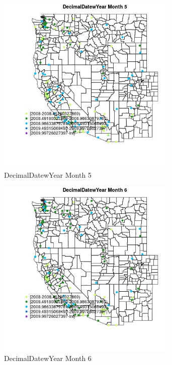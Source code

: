 \begin{figure} 
\centering  
\includegraphics[width=0.77\textwidth]{Code_Outputs/Report_ML_input_PM25_Step4_part_e_de_duplicated_aves_MapObsMo5DecimalDatewYear.jpg} 
\caption{\label{fig:Report_ML_input_PM25_Step4_part_e_de_duplicated_avesMapObsMo5DecimalDatewYear}DecimalDatewYear Month 5} 
\end{figure} 
 

\begin{figure} 
\centering  
\includegraphics[width=0.77\textwidth]{Code_Outputs/Report_ML_input_PM25_Step4_part_e_de_duplicated_aves_MapObsMo6DecimalDatewYear.jpg} 
\caption{\label{fig:Report_ML_input_PM25_Step4_part_e_de_duplicated_avesMapObsMo6DecimalDatewYear}DecimalDatewYear Month 6} 
\end{figure} 
 


